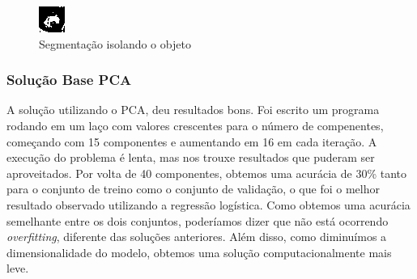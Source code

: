 \documentclass[conference]{IEEEtran}
\begin{document}
\begin{figure}[H]
  \includegraphics[center]{seg2.png}
  \caption{Segmentação isolando o objeto}
  \label{fig:frog1}
\end{figure}

\subsubsection{Solução Base PCA}
A solução utilizando o PCA, deu resultados bons. Foi escrito um programa rodando em um laço com valores crescentes para o número de compenentes, começando com 15 componentes e aumentando em 16 em cada iteração. A execução do problema é lenta, mas nos trouxe resultados que puderam ser aproveitados. Por volta de 40 componentes, obtemos uma acurácia de 30\% tanto para o conjunto de treino como o conjunto de validação, o que foi o melhor resultado observado utilizando a regressão logística. Como obtemos uma acurácia semelhante entre os dois conjuntos, poderíamos dizer que não está ocorrendo \textit{overfitting}, diferente das soluções anteriores. Além disso, como diminuímos a dimensionalidade do modelo, obtemos uma solução computacionalmente mais leve.
\end{document}
